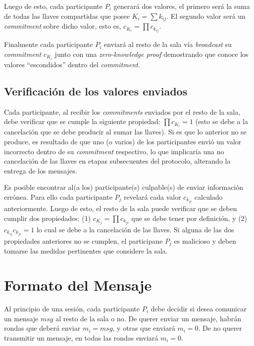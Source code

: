 Luego de esto, cada participante $P_i$ generará dos valores, el primero será 
la suma de todas las llaves compartidas que posee $K_i = \sum k_{ij}$. El 
segundo valor será un \emph{commitment} sobre dicho valor, esto es, 
$c_{K_i} = \prod c_{k_{ij}}$.

Finalmente cada participante $P_i$ enviará al resto de la sala vía 
\emph{broadcast} su \emph{commitment} $c_{K_i}$ junto con una 
\emph{zero-knowledge proof} demostrando que conoce los valores ``escondidos'' 
dentro del \emph{commitment}.

\subsection{Verificación de los valores enviados}

Cada participante, al recibir los \emph{commitments} enviados por el resto de la 
sala, debe verificar que se cumple la siguiente propiedad: $\prod c_{K_i} = 1$ 
(esto se debe a la cancelación que se debe producir al sumar las llaves). Si es que 
lo anterior no se produce, es resultado de que uno (o varios) de los participantes envió un 
valor incorrecto dentro de su \emph{commitment} respectivo, lo que implicaría una 
no cancelación de las llaves en etapas subsecuentes del protocolo, alterando la entrega 
de los mensajes.

Es posible encontrar al(a los) participante(s) culpable(s) de enviar información errónea. 
Para ello cada participante $P_j$ revelará cada valor $c_{k_{ji}}$ calculado anteriormente. 
Luego de esto, el resto de la sala puede verificar que se deben cumplir dos propiedades: 
(1) $c_{K_j} = \prod c_{k_{ji}}$ que se debe tener por definición, y 
(2) $c_{k_{ij}} c_{k_{ji}} = 1$ lo cual se debe a la cancelación de las llaves. Si alguna 
de las dos propiedades anteriores no se cumplen, el participane $P_j$ es malicioso y deben 
tomarse las medidas pertinentes que considere la sala.

\section{Formato del Mensaje}

Al principio de una sesión, cada participante $P_i$ debe decidir si desea comunicar 
un mensaje $msg$ al resto de la sala o no. De querer enviar un mensaje, habrán 
rondas que deberá enviar $m_i = msg$, y otras que enviará $m_i = 0$. De no querer 
transmitir un mensaje, en todas las rondas enviará $m_i = 0$. 


